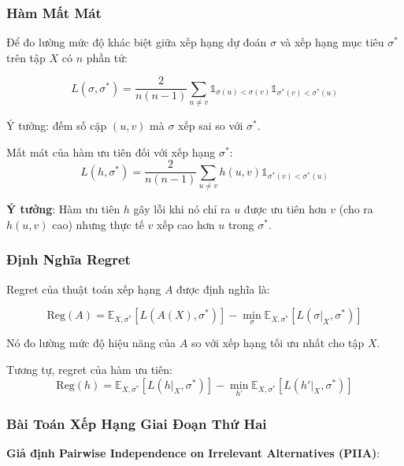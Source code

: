 \subsubsection{Hàm Mất Mát}

Để đo lường mức độ khác biệt giữa xếp hạng dự đoán $\sigma$ và xếp hạng mục tiêu $\sigma^*$ trên tập $X$ có $n$ phần tử:

\begin{equation}
L(\sigma, \sigma^*) = \frac{2}{n(n-1)}\sum_{u \neq v} \mathbb{1}_{\sigma(u) < \sigma(v)} \mathbb{1}_{\sigma^*(v) < \sigma^*(u)}
\end{equation}

Ý tưởng: đếm số cặp $(u,v)$ mà $\sigma$ xếp sai so với $\sigma^*$.

Mất mát của hàm ưu tiên đối với xếp hạng $\sigma^*$:
\begin{equation}
L(h, \sigma^*) = \frac{2}{n(n-1)}\sum_{u \neq v} h(u,v) \mathbb{1}_{\sigma^*(v) < \sigma^*(u)}
\end{equation}

\textbf{Ý tưởng}: Hàm ưu tiên $h$ gây lỗi khi nó chỉ ra $u$ được ưu tiên hơn $v$ (cho ra $h(u,v)$ cao) nhưng thực tế $v$ xếp cao hơn $u$ trong $\sigma^*$.

\subsubsection{Định Nghĩa Regret}

Regret của thuật toán xếp hạng $A$ được định nghĩa là:

\begin{equation}
\text{Reg}(A) = \mathbb{E}_{X,\sigma^*}[L(A(X), \sigma^*)] - \min_{\sigma} \mathbb{E}_{X,\sigma^*}[L(\sigma|_X, \sigma^*)]
\end{equation}

Nó đo lường mức độ hiệu năng của $A$ so với xếp hạng tối ưu nhất cho tập $X$.

Tương tự, regret của hàm ưu tiên:
\begin{equation}
\text{Reg}(h) = \mathbb{E}_{X,\sigma^*}[L(h|_X, \sigma^*)] - \min_{h'} \mathbb{E}_{X,\sigma^*}[L(h'|_X, \sigma^*)]
\end{equation}

\subsubsection{Bài Toán Xếp Hạng Giai Đoạn Thứ Hai}

\textbf{Giả định Pairwise Independence on Irrelevant Alternatives (PIIA)}:

